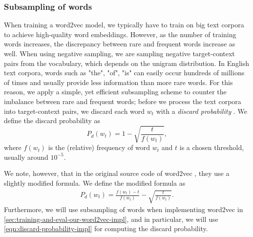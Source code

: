 \subsubsection{Subsampling of words}
When training a word2vec model, we typically have to train on big text corpora to achieve high-quality word embeddings. However, as the number of training words increases, the discrepancy between rare and frequent words increase as well. When using negative sampling, we are sampling negative target-context pairs from the vocabulary, which depends on the unigram distribution. In English text corpora, words such as "the", "of", "is" can easily occur hundreds of millions of times and usually provide less information than more rare words. For this reason, we apply a simple, yet efficient subsampling scheme to counter the imbalance between rare and frequent words; before we process the text corpora into target-context pairs, we discard each word $w_t$ with a \textit{discard probability} \cite{mikolov2013b, levy-etal-2015-improving}. We define the discard probability as
\begin{equation}
    P_d(w_t) = 1 - \sqrt{\frac{t}{f(w_t)}},
\end{equation}
where $f(w_t)$ is the (relative) frequency of word $w_t$ and $t$ is a chosen threshold, usually around $10^{-5}$.

We note, however, that in the original source code of word2vec \cite[line 407]{Word2vecCCode}, they use a slightly modified formula. We define the modified formula as 
\begin{align}
    P_d(w_t) = \frac{f(w_t) - t}{f(w_t)} - \sqrt{\frac{t}{f(w_t)}}.
    \label{eqn:discard-probability-impl}
\end{align}
Furthermore, we will use subsampling of words when implementing word2vec in \cref{sec:training-and-eval-our-word2vec-impl}, and in particular, we will use \cref{eqn:discard-probability-impl} for computing the discard probability.


